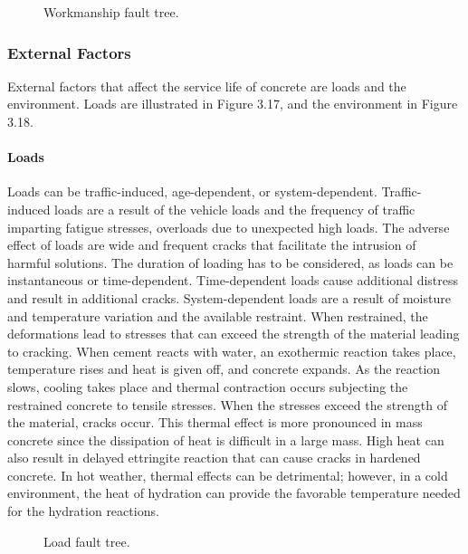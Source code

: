 \begin{figure}
  \caption{Workmanship fault tree.}
  \label{fig:fault-tree-workmanship}
\end{figure}

\subsubsection{External Factors}
External factors that affect the service life of concrete are loads and the environment. Loads are illustrated in
Figure 3.17, and the environment in Figure 3.18.

\paragraph{Loads}
Loads can be traffic-induced, age-dependent, or system-dependent. Traffic-induced loads are a result of the
vehicle loads and the frequency of traffic imparting fatigue stresses, overloads due to unexpected high loads. The
adverse effect of loads are wide and frequent cracks that facilitate the intrusion of harmful solutions. The duration of
loading has to be considered, as loads can be instantaneous or time-dependent. Time-dependent loads cause
additional distress and result in additional cracks. System-dependent loads are a result of moisture and temperature
variation and the available restraint. When restrained, the deformations lead to stresses that can exceed the strength
of the material leading to cracking. When cement reacts with water, an exothermic reaction takes place, temperature
rises and heat is given off, and concrete expands. As the reaction slows, cooling takes place and thermal contraction
occurs subjecting the restrained concrete to tensile stresses. When the stresses exceed the strength of the material,
cracks occur. This thermal effect is more pronounced in mass concrete since the dissipation of heat is difficult in a
large mass. High heat can also result in delayed ettringite reaction that can cause cracks in hardened concrete. In
hot weather, thermal effects can be detrimental; however, in a cold environment, the heat of hydration can provide
the favorable temperature needed for the hydration reactions.

\begin{figure}
  \caption{Load fault tree.}
  \label{fig:fault-tree-load} 
\end{figure}

